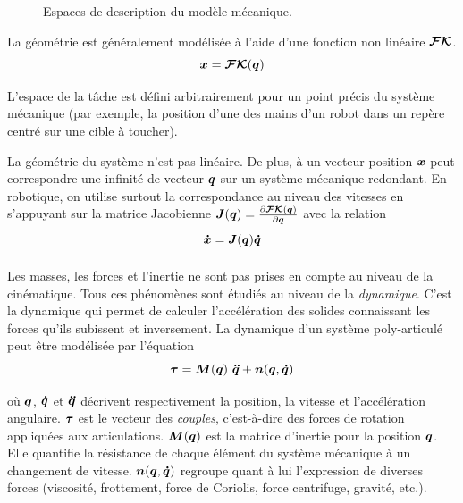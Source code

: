 \documentclass[pdftex,a4paper,11pt]{article}
\begin{document}
\begin{figure}[ht]
    \centering
    
    \caption{Espaces de description du modèle mécanique.}
    \label{fig:arm-space}
\end{figure}

La géométrie est généralement modélisée à l'aide d'une fonction non linéaire
$\boldsymbol{\mathcal{FK}}$.
\begin{equation}
    \boldsymbol{x} = \boldsymbol{\mathcal{FK}}(\boldsymbol{q})
\end{equation}

L'espace de la tâche est défini arbitrairement pour un point précis du système
mécanique (par exemple, la position d'une des mains d'un robot dans un repère
centré sur une cible à toucher).

La géométrie du système n'est pas linéaire. De plus, à un vecteur position $\boldsymbol{x}$ peut
correspondre une infinité de vecteur $\boldsymbol{q}$ sur un système mécanique redondant.
En robotique, on utilise surtout la correspondance au niveau des vitesses en s'appuyant
sur la matrice Jacobienne $\boldsymbol{J}(\boldsymbol{q})=\frac{\partial {\boldsymbol{\mathcal{FK}}(\boldsymbol{q})}}{\partial {\boldsymbol{q}}}$ avec la relation
\begin{equation}
    \label{eq:fvk}
    \boldsymbol{\dot{x}} = \boldsymbol{J}(\boldsymbol{q})\boldsymbol{\dot{q}}
\end{equation}

\paragraph{}
Les masses, les forces et l'inertie ne sont pas prises en compte au niveau de
la cinématique.
Tous ces phénomènes sont étudiés au niveau de la {\em dynamique}.  C'est la
dynamique qui permet de calculer l'accélération des solides connaissant les
forces qu'ils subissent et inversement.
La dynamique d'un système poly-articulé peut être modélisée par l'équation
\begin{equation}
    \label{eq:dyn}
    \boldsymbol{\tau} = \boldsymbol{M}(\boldsymbol{q}) ~ \boldsymbol{\ddot{q}} + \boldsymbol{n}(\boldsymbol{q}, \boldsymbol{\dot{q}})
\end{equation}

où $\boldsymbol{q}$, $\boldsymbol{\dot{q}}$ et $\boldsymbol{\ddot{q}}$ décrivent respectivement la position, la vitesse et
l'accé\-lé\-ra\-tion angulaire.
$\boldsymbol{\tau}$ est le vecteur des {\em couples}, c'est-à-dire des forces de rotation 
appliquées aux articulations.
$\boldsymbol{M}(\boldsymbol{q})$ est la matrice d'inertie pour la position $\boldsymbol{q}$. Elle quantifie la
résistance de chaque élément du système mécanique à un changement de vitesse.
$\boldsymbol{n}(\boldsymbol{q}, \boldsymbol{\dot{q}})$ regroupe quant à lui l'expression de diverses forces
(viscosité, frottement, force de Coriolis, force centrifuge, gravité, etc.).
\end{document}
